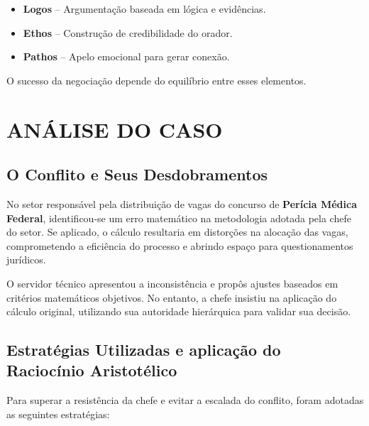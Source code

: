 \documentclass[article,12pt,oneside,a4paper]{article}
\begin{document}
\begin{itemize}
\item \textbf{Logos} – Argumentação baseada em lógica e evidências.
\item \textbf{Ethos} – Construção de credibilidade do orador.
\item \textbf{Pathos} – Apelo emocional para gerar conexão.
\end{itemize}

O sucesso da negociação depende do equilíbrio entre esses elementos.
\section{ANÁLISE DO CASO}
\label{sec:orgbd5ef26}
\subsection{O Conflito e Seus Desdobramentos}
\label{sec:org02ef109}
No setor responsável pela distribuição de vagas do concurso de \textbf{Perícia Médica Federal}, identificou-se um erro matemático na metodologia adotada pela chefe do setor. Se aplicado, o cálculo resultaria em distorções na alocação das vagas, comprometendo a eficiência do processo e abrindo espaço para questionamentos jurídicos.

O servidor técnico apresentou a inconsistência e propôs ajustes baseados em critérios matemáticos objetivos. No entanto, a chefe insistiu na aplicação do cálculo original, utilizando sua autoridade hierárquica para validar sua decisão.
\subsection{Estratégias Utilizadas e aplicação do Raciocínio Aristotélico}
\label{sec:orgb578bb9}
Para superar a resistência da chefe e evitar a escalada do conflito, foram adotadas as seguintes estratégias:
\end{document}
